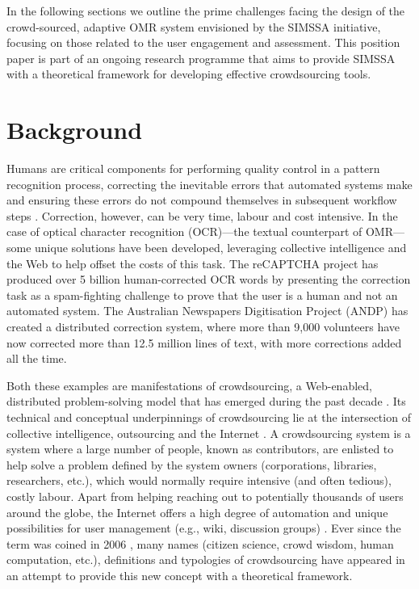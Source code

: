 \documentclass{sig-alternate}
\begin{document}
In the following sections we outline the prime challenges facing the design of the crowd-sourced, adaptive OMR system envisioned by the SIMSSA initiative, focusing on those related to the user engagement and assessment. This position paper is part of an ongoing research programme that aims to provide SIMSSA with a theoretical framework for developing effective crowdsourcing tools. 

\section{Background}

Humans are critical components for performing quality control in a pattern recognition process, correcting the inevitable errors that automated systems make and ensuring these errors do not compound themselves in subsequent workflow steps \cite{hankinson2012b,burlet2012}. Correction, however, can be very time, labour and cost intensive. In the case of optical character recognition (OCR)---the textual counterpart of OMR---some unique solutions have been developed, leveraging collective intelligence and the Web to help offset the costs of this task. The reCAPTCHA project \cite{ahn2008} has produced over 5 billion human-corrected OCR words by presenting the correction task as a spam-fighting challenge to prove that the user is a human and not an automated system. The Australian Newspapers Digitisation Project (ANDP) \cite{holley2009} has created a distributed correction system, where more than 9,000 volunteers have now corrected more than 12.5 million lines of text, with more corrections added all the time.

Both these examples are manifestations of crowdsourcing, a Web-enabled, distributed problem-solving model that has emerged during the past decade \cite{brabham2008}. Its technical and conceptual underpinnings of crowdsourcing lie at the intersection of collective intelligence, outsourcing and the Internet \cite{brabham2013,saxton2013}. A crowdsourcing system is a system where a large number of people, known as contributors, are enlisted to help solve a problem defined by the system owners (corporations, libraries, researchers, etc.), which would normally require intensive (and often tedious), costly labour. Apart from helping reaching out to potentially thousands of users around the globe, the Internet offers a high degree of automation and unique possibilities for user management (e.g., wiki, discussion groups) \cite{doan2011}. Ever since the term was coined in 2006 \cite{howe2006nourl}, many names (citizen science, crowd wisdom, human computation, etc.), definitions \cite{arolas2012} and typologies \cite{geiger2011} of crowdsourcing have appeared in an attempt to provide this new concept with a theoretical framework. 
\end{document}
